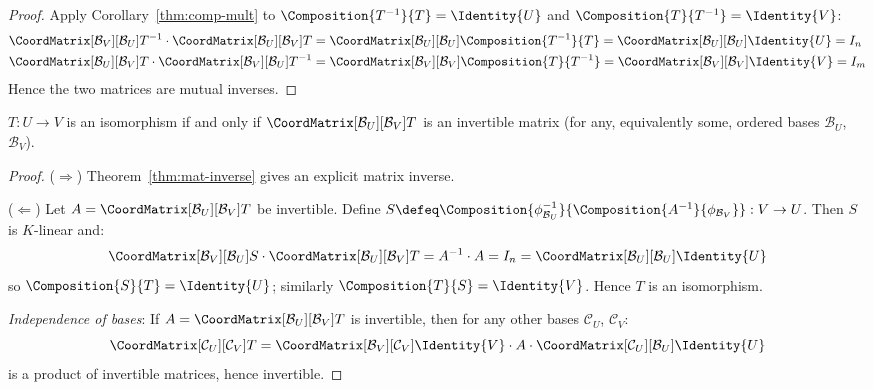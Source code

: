 \begin{proof}
    Apply Corollary~\ref{thm:comp-mult} to
    $\Composition{T^{-1}}{T} = \Identity{U}$ and
    $\Composition{T}{T^{-1}} = \Identity{V}$:
    \begin{align*}
        \CoordMatrix[\mathcal{B}_V][\mathcal{B}_U]{T^{-1}}
        \cdot \CoordMatrix[\mathcal{B}_U][\mathcal{B}_V]{T}
        &= \CoordMatrix[\mathcal{B}_U][\mathcal{B}_U]{\Composition{T^{-1}}{T}}
         = \CoordMatrix[\mathcal{B}_U][\mathcal{B}_U]{\Identity{U}}
         = I_n \\
        \CoordMatrix[\mathcal{B}_U][\mathcal{B}_V]{T}
        \cdot \CoordMatrix[\mathcal{B}_V][\mathcal{B}_U]{T^{-1}}
        &= \CoordMatrix[\mathcal{B}_V][\mathcal{B}_V]{\Composition{T}{T^{-1}}}
         = \CoordMatrix[\mathcal{B}_V][\mathcal{B}_V]{\Identity{V}}
         = I_m
    \end{align*}
    Hence the two matrices are mutual inverses. \qedhere
\end{proof}

\begin{corollary}
\label{cor:invertible-iff-mat-invertible}
    $T: U \to V$ is an isomorphism if and only if
    $\CoordMatrix[\mathcal{B}_U][\mathcal{B}_V]{T}$ is an invertible matrix (for any,
    equivalently some, ordered bases $\mathcal{B}_U$, $\mathcal{B}_V$).
\end{corollary}

\begin{proof}
    ($\Rightarrow$) Theorem~\ref{thm:mat-inverse} gives an explicit matrix inverse.

    ($\Leftarrow$) Let $A = \CoordMatrix[\mathcal{B}_U][\mathcal{B}_V]{T}$ be invertible.
    Define $S \defeq \Composition{\phi_{\mathcal{B}_U}^{-1}}
    {\Composition{A^{-1}}{\phi_{\mathcal{B}_V}}}: V \to U$.
    Then $S$ is $K$-linear and:
    \[
        \CoordMatrix[\mathcal{B}_V][\mathcal{B}_U]{S}
        \cdot \CoordMatrix[\mathcal{B}_U][\mathcal{B}_V]{T}
        = A^{-1} \cdot A = I_n
        = \CoordMatrix[\mathcal{B}_U][\mathcal{B}_U]{\Identity{U}}
    \]
    so $\Composition{S}{T} = \Identity{U}$; similarly $\Composition{T}{S} = \Identity{V}$.
    Hence $T$ is an isomorphism.

    \textit{Independence of bases}: If $A = \CoordMatrix[\mathcal{B}_U][\mathcal{B}_V]{T}$
    is invertible, then for any other bases $\mathcal{C}_U$, $\mathcal{C}_V$:
    \[
        \CoordMatrix[\mathcal{C}_U][\mathcal{C}_V]{T}
        = \CoordMatrix[\mathcal{B}_V][\mathcal{C}_V]{\Identity{V}}
          \cdot A
          \cdot \CoordMatrix[\mathcal{C}_U][\mathcal{B}_U]{\Identity{U}}
    \]
    is a product of invertible matrices, hence invertible. \qedhere
\end{proof}

